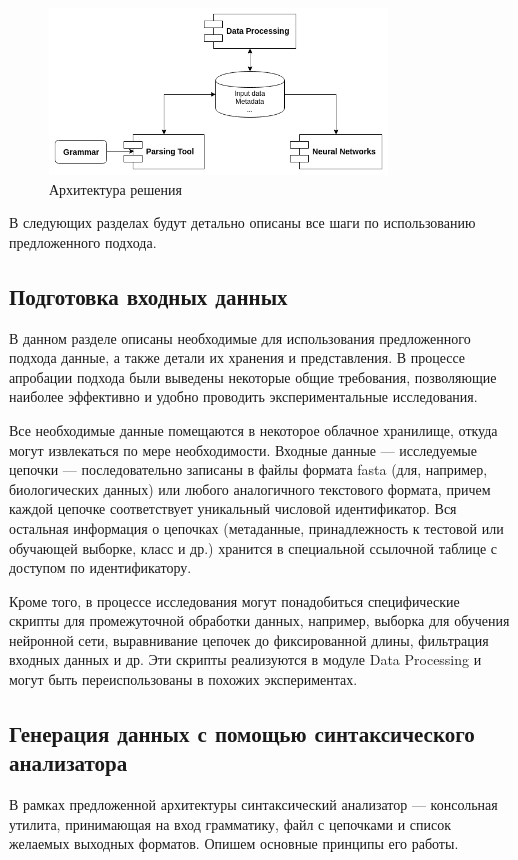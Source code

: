 \begin{figure}[h]
\begin{center}
\centering
\includegraphics[width=0.8\textwidth]{Lunina/pics/arch.png}
\caption{Архитектура решения}
\label{arch}
\end{center}
\end{figure}

В следующих разделах будут детально описаны все шаги по использованию предложенного подхода.

\subsection{Подготовка входных данных}

В данном разделе описаны необходимые для использования
предложенного подхода данные, а также детали их хранения и представления. В процессе апробации подхода были выведены некоторые общие требования, позволяющие наиболее эффективно и удобно проводить экспериментальные исследования.

Все необходимые данные помещаются в некоторое облачное хранилище, откуда могут извлекаться по мере необходимости. Входные данные --- исследуемые цепочки --- последовательно записаны в файлы формата fasta (для, например, биологических данных) или любого аналогичного текстового формата, причем каждой цепочке соответствует уникальный числовой идентификатор. Вся остальная информация о цепочках (метаданные, принадлежность к тестовой или обучающей выборке, класс и др.) хранится в специальной ссылочной таблице с доступом по идентификатору.

Кроме того, в процессе исследования могут понадобиться специфические скрипты для промежуточной обработки данных, например, выборка для обучения нейронной сети, выравнивание цепочек до фиксированной длины, фильтрация входных данных и др. Эти скрипты реализуются в модуле Data Processing и могут быть переиспользованы в похожих экспериментах.

\subsection{Генерация данных с помощью синтаксического анализатора}
В рамках предложенной архитектуры синтаксический анализатор --- консольная утилита, принимающая на вход грамматику, файл с цепочками и список желаемых выходных форматов. Опишем основные принципы его работы.

